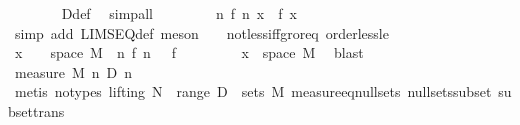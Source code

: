 \begin{isabellebody}
\ \ \ \ \ \ \isamarkupfalse%
\ D{\isacharunderscore}{\kern0pt}def\ \isamarkupfalse%
\ simp{\isacharunderscore}{\kern0pt}all\isanewline
\ \ \ \ \isamarkupfalse%
\ \isamarkupfalse%
\ {\isachardoublequoteopen}{\isasymnot}\ {\isacharparenleft}{\kern0pt}{\isasymlambda}n{\isachardot}{\kern0pt}\ f{\isacharprime}{\kern0pt}\ n\ x{\isacharparenright}{\kern0pt}\ {\isasymlonglonglongrightarrow}\ f\ x{\isachardoublequoteclose}\isanewline
\ \ \ \ \ \ \isamarkupfalse%
\ {\isacharparenleft}{\kern0pt}simp\ add{\isacharcolon}{\kern0pt}\ LIMSEQ{\isacharunderscore}{\kern0pt}def{\isacharparenright}{\kern0pt}\ {\isacharparenleft}{\kern0pt}meson\ {\isacartoucheopen}{}\ {\isacharless}{\kern0pt}\ {\isasymepsilon}{\isacartoucheclose}\ not{\isacharunderscore}{\kern0pt}less{\isacharunderscore}{\kern0pt}iff{\isacharunderscore}{\kern0pt}gr{\isacharunderscore}{\kern0pt}or{\isacharunderscore}{\kern0pt}eq\ order{\isacharunderscore}{\kern0pt}less{\isacharunderscore}{\kern0pt}le{\isacharparenright}{\kern0pt}\isanewline
\ \ \ \ \isamarkupfalse%
\ \isamarkupfalse%
\ {\isachardoublequoteopen}x\ {\isasymin}\ {\isacharbraceleft}{\kern0pt}{\isasymomega}\ {\isasymin}\ space\ M{\isachardot}{\kern0pt}\ {\isasymnot}\ {\isacharparenleft}{\kern0pt}{\isasymlambda}n{\isachardot}{\kern0pt}\ f{\isacharprime}{\kern0pt}\ n\ {\isasymomega}{\isacharparenright}{\kern0pt}\ {\isasymlonglonglongrightarrow}\ f\ {\isasymomega}{\isacharbraceright}{\kern0pt}{\isachardoublequoteclose}\isanewline
\ \ \ \ \ \ \isamarkupfalse%
\ {\isacartoucheopen}x\ {\isasymin}\ space\ M{\isacartoucheclose}\ \isamarkupfalse%
\ blast\isanewline
\ \ \isamarkupfalse%
\isanewline
\ \ \isamarkupfalse%
\ \isamarkupfalse%
\ {\isachardoublequoteopen}measure\ M\ {\isacharparenleft}{\kern0pt}{\isasymInter}n{\isachardot}{\kern0pt}\ D\ n{\isacharparenright}{\kern0pt}\ {\isacharequal}{\kern0pt}\ {}{\isachardoublequoteclose}\isanewline
\ \ \ \ \isamarkupfalse%
\ {\isacharparenleft}{\kern0pt}metis\ {\isacharparenleft}{\kern0pt}no{\isacharunderscore}{\kern0pt}types{\isacharcomma}{\kern0pt}\ lifting{\isacharparenright}{\kern0pt}\ N\ {\isacartoucheopen}{\isasymInter}\ {\isacharparenleft}{\kern0pt}range\ D{\isacharparenright}{\kern0pt}\ {\isasymin}\ sets\ M{\isacartoucheclose}\ measure{\isacharunderscore}{\kern0pt}eq{\isacharunderscore}{\kern0pt}{}{\isacharunderscore}{\kern0pt}null{\isacharunderscore}{\kern0pt}sets\ null{\isacharunderscore}{\kern0pt}sets{\isacharunderscore}{\kern0pt}subset\ subset{\isacharunderscore}{\kern0pt}trans{\isacharparenright}{\kern0pt}\isanewline

\end{isabellebody}
